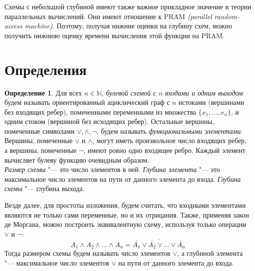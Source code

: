 \documentclass[12pt]{article}
\theoremstyle{plain}
\theoremstyle{remark}
\theoremstyle{definition}
\newtheorem{definition}{Определение}
\begin{document}
Схемы с небольшой глубиной имеют также важное прикладное значение в теории параллельных вычислений. Они имеют отношение к PRAM \emph{(parallel random-access machine)}. Поэтому, получая нижние оценки на глубину схем, можно получить нижнюю оценку времени вычисления этой функции на PRAM.



\section{Определения}
\begin{definition}

Для всех $n \in \mathbb{N}$, \emph{булевой схемой с $n$ входами и одним выходом} будем называть ориентированный ациклический граф с $n$ истоками (вершинами без входящих ребер), помеченными переменными из множества $\{x_1, . . . , x_n\}$, и одним стоком (вершиной без исходящих ребер).  Остальные вершины, помеченные символами $\vee, \wedge, \lnot$, будем называть \emph{функциональными элементами}. Вершины, помеченные  $\vee$ и $\wedge$, могут иметь произвольное число входящих ребер, а вершины, помеченные $\lnot$, имеют ровно одно входящее ребро. Каждый элемент вычисляет булеву функцию очевидным образом. \\
\emph{Размер схемы} "--- это число элементов в ней. \emph{Глубина элемента} "--- это максимальное число элементов на пути от данного элемента  до входа. \emph{Глубина схемы} "--- глубина выхода. \\




\end{definition}

Везде далее, для простоты изложения, будем считать, что входными элементами являются не только сами переменные, но и их отрицания. Также, применяя закон де Моргана, можно построить эквивалентную схему, используя только операции $\vee$ и $\lnot$:
\[ A_1 \wedge A_2 \wedge \ldots \wedge A_n  = \overline{\overline{A_1} \vee \overline{A_2} \vee \ldots \vee \overline{A_n}}\]
Тогда размером схемы будем называть число элементов $\vee$, а глубиной элемента "--- максимальное число элементов $\vee$ на пути от данного элемента до входа.
\end{document}
